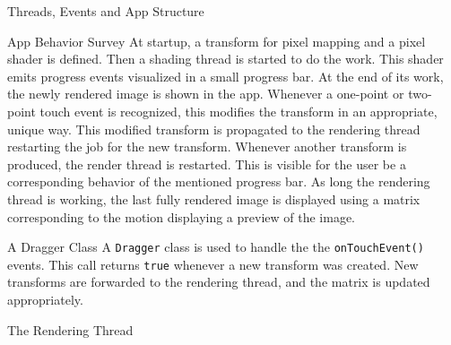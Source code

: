 \documentclass[a4paper,fleqn]{article}
\newcommand{\eeeccc}{\end{section}}
\numberwithin{equation}{section}
\newcommand{\beginchap}[1]{\begin{section}{#1}
}
\begin{document}
\beginchap{Threads, Events and App Structure}
\begin{subsection}{App Behavior Survey}
At startup, a transform for pixel mapping and a pixel shader is defined. Then a shading thread is started to do the work. This shader emits progress events visualized in a small progress bar.
At the end of its work, the newly rendered image is shown in the app. Whenever a one-point or two-point touch event is recognized, this modifies the transform in an appropriate, unique way. This modified transform is propagated to the rendering thread restarting the job for the new transform. Whenever another transform is produced, the render thread is restarted. This is visible for the user be a corresponding behavior of the mentioned progress bar. As long the rendering thread is working, the last fully rendered image is displayed using a matrix corresponding to the motion displaying a preview of the image.
\end{subsection}

\begin{subsection}{A Dragger Class}
A \verb{Dragger{ class is used to handle the the \verb{onTouchEvent(){ events. This call returns \verb{true{ whenever a new transform was created. New transforms are forwarded to the rendering thread, and the matrix is updated appropriately.
\end{subsection}

\begin{subsection}{The Rendering Thread}

\end{subsection}

\eeeccc
\end{document}
